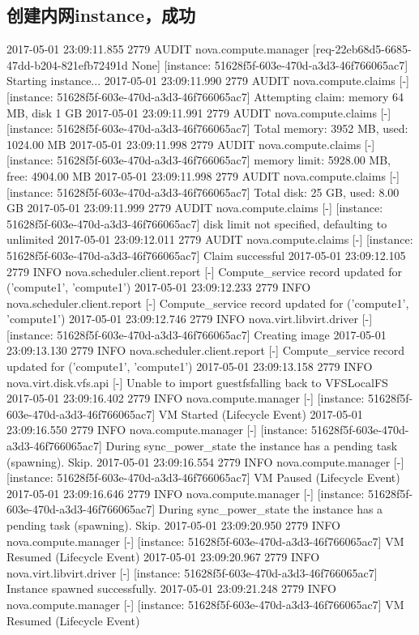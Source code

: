 \documentclass[a4paper,left=1.5cm,right=1.5cm,11pt]{article}
\begin{document}
\tableofcontents

\clearpage

\subsection{创建内网instance，成功}
2017-05-01 23:09:11.855 2779 AUDIT nova.compute.manager [req-22eb68d5-6685-47dd-b204-821efb72491d None] [instance: 51628f5f-603e-470d-a3d3-46f766065ac7] Starting instance...
2017-05-01 23:09:11.990 2779 AUDIT nova.compute.claims [-] [instance: 51628f5f-603e-470d-a3d3-46f766065ac7] Attempting claim: memory 64 MB, disk 1 GB
2017-05-01 23:09:11.991 2779 AUDIT nova.compute.claims [-] [instance: 51628f5f-603e-470d-a3d3-46f766065ac7] Total memory: 3952 MB, used: 1024.00 MB
2017-05-01 23:09:11.998 2779 AUDIT nova.compute.claims [-] [instance: 51628f5f-603e-470d-a3d3-46f766065ac7] memory limit: 5928.00 MB, free: 4904.00 MB
2017-05-01 23:09:11.998 2779 AUDIT nova.compute.claims [-] [instance: 51628f5f-603e-470d-a3d3-46f766065ac7] Total disk: 25 GB, used: 8.00 GB
2017-05-01 23:09:11.999 2779 AUDIT nova.compute.claims [-] [instance: 51628f5f-603e-470d-a3d3-46f766065ac7] disk limit not specified, defaulting to unlimited
2017-05-01 23:09:12.011 2779 AUDIT nova.compute.claims [-] [instance: 51628f5f-603e-470d-a3d3-46f766065ac7] Claim successful
2017-05-01 23:09:12.105 2779 INFO nova.scheduler.client.report [-] Compute_service record updated for ('compute1', 'compute1')
2017-05-01 23:09:12.233 2779 INFO nova.scheduler.client.report [-] Compute_service record updated for ('compute1', 'compute1')
2017-05-01 23:09:12.746 2779 INFO nova.virt.libvirt.driver [-] [instance: 51628f5f-603e-470d-a3d3-46f766065ac7] Creating image
2017-05-01 23:09:13.130 2779 INFO nova.scheduler.client.report [-] Compute_service record updated for ('compute1', 'compute1')
2017-05-01 23:09:13.158 2779 INFO nova.virt.disk.vfs.api [-] Unable to import guestfsfalling back to VFSLocalFS
2017-05-01 23:09:16.402 2779 INFO nova.compute.manager [-] [instance: 51628f5f-603e-470d-a3d3-46f766065ac7] VM Started (Lifecycle Event)
2017-05-01 23:09:16.550 2779 INFO nova.compute.manager [-] [instance: 51628f5f-603e-470d-a3d3-46f766065ac7] During sync_power_state the instance has a pending task (spawning). Skip.
2017-05-01 23:09:16.554 2779 INFO nova.compute.manager [-] [instance: 51628f5f-603e-470d-a3d3-46f766065ac7] VM Paused (Lifecycle Event)
2017-05-01 23:09:16.646 2779 INFO nova.compute.manager [-] [instance: 51628f5f-603e-470d-a3d3-46f766065ac7] During sync_power_state the instance has a pending task (spawning). Skip.
2017-05-01 23:09:20.950 2779 INFO nova.compute.manager [-] [instance: 51628f5f-603e-470d-a3d3-46f766065ac7] VM Resumed (Lifecycle Event)
2017-05-01 23:09:20.967 2779 INFO nova.virt.libvirt.driver [-] [instance: 51628f5f-603e-470d-a3d3-46f766065ac7] Instance spawned successfully.
2017-05-01 23:09:21.248 2779 INFO nova.compute.manager [-] [instance: 51628f5f-603e-470d-a3d3-46f766065ac7] VM Resumed (Lifecycle Event)
\end{document}
